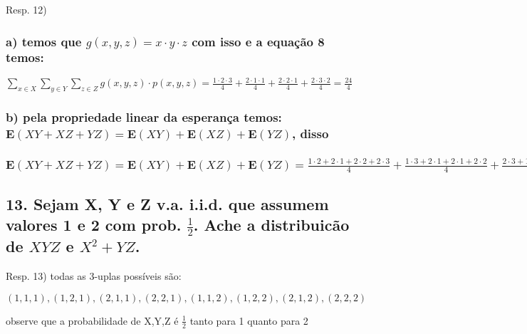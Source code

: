 \documentclass[portuguese]{article}
\begin{document}
Resp. 12)


\subsubsection*{\textmd{a) temos que $g(x,y,z)=x\cdot y\cdot z$ com isso e a equação
8 temos:}}

$\sum_{x\in X}\sum_{y\in Y}\sum_{z\in Z}g(x,y,z)\cdot p(x,y,z)=\frac{1\cdot2\cdot3}{4}+\frac{2\cdot1\cdot1}{4}+\frac{2\cdot2\cdot1}{4}+\frac{2\cdot3\cdot2}{4}=\frac{24}{4}$


\subsubsection*{\textmd{b) pela propriedade linear da esperança temos: }$\mathbf{E}(XY+XZ+YZ)=\mathbf{E}(XY)+\mathbf{E}(XZ)+\mathbf{E}(YZ)$,
\textmd{disso}}


\subsubsection*{$\mathbf{E}(XY+XZ+YZ)=\mathbf{E}(XY)+\mathbf{E}(XZ)+\mathbf{E}(YZ)=\frac{1\cdot2+2\cdot1+2\cdot2+2\cdot3}{4}+\frac{1\cdot3+2\cdot1+2\cdot1+2\cdot2}{4}+\frac{2\cdot3+1\cdot1+2\cdot1+3\cdot2}{4}=\frac{40}{4}$}


\subsection*{\textmd{13. Sejam X, Y e Z v.a. i.i.d. que assumem valores 1 e 2
com prob. $\frac{1}{2}$. Ache a distribuicão de $XYZ$ e $X^{2}+YZ$. }}

Resp. 13) todas as 3-uplas possíveis são:

$(1,1,1),(1,2,1),(2,1,1),(2,2,1),(1,1,2),(1,2,2),(2,1,2),(2,2,2)$

observe que a probabilidade de X,Y,Z é $\frac{1}{2}$ tanto para 1
quanto para 2
\end{document}
